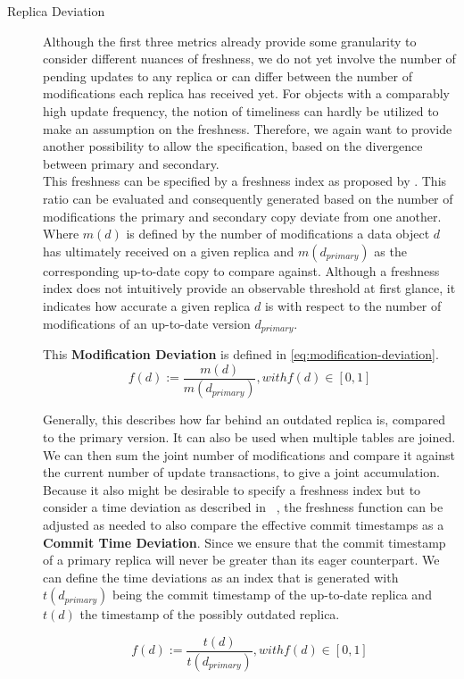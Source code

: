 \begin{description}
    \item [Replica Deviation] Although the first three metrics already provide some granularity to consider different nuances of freshness, we 
        do not yet involve the number of pending updates to any replica or can differ between the number of modifications each replica has received yet.
        For objects with a comparably high update frequency, the notion of timeliness can hardly be utilized to make an assumption on the freshness.
        Therefore, we again want to provide another possibility to allow the specification, based on the divergence between primary and secondary.\\
        This freshness can be specified by a freshness index as proposed by \cite{rohm:2002}.
        This ratio can be evaluated and consequently generated based on the number of modifications the primary and 
        secondary copy deviate from one another. Where $m(d)$ is defined by the number of modifications a data object $d$ has ultimately received on a given replica
        and $m(d_{primary})$ as the corresponding up-to-date copy to compare against. 
        Although a freshness index does not intuitively provide an observable threshold at first glance, it indicates how accurate a 
        given replica $d$ is with respect to the number of modifications of an up-to-date version $d_{primary}$.

        This \textbf{Modification Deviation} is defined in \ref{eq:modification-deviation}.
        \begin{equation} \label{eq:modification-deviation}
            f(d) := \frac{m(d)}{m(d_{primary})},  with f(d) \in [0,1]
        \end{equation}
        
        Generally, this describes how far behind an outdated replica is, compared to the primary version.
        It can also be used when multiple tables are joined.
        We can then sum the joint number of modifications and compare it against the current number of update transactions, to give a joint accumulation.\\

        Because it also might be desirable to specify a freshness index but to consider a time deviation as described in ~\cite{voicu:2010,hennemann_sw_2021},
        the freshness function can be adjusted as needed to also compare the effective commit timestamps as a \textbf{Commit Time Deviation}.
        Since we ensure that the commit timestamp of a primary replica will never be greater than its eager counterpart. We can define the time deviations as an index that is 
        generated with $t(d_{primary})$ being the commit timestamp of the up-to-date replica and $t(d)$ the timestamp of the possibly outdated replica.


        \begin{equation}
            f(d) := \frac{t(d)}{t(d_{primary})},  with f(d) \in [0,1]
        \end{equation}

\end{description}

